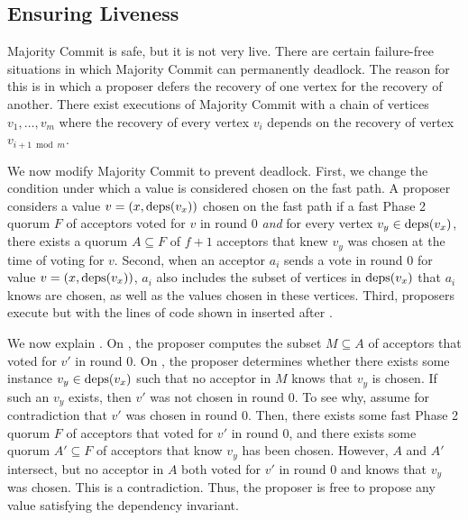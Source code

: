 \subsection{Ensuring Liveness}
Majority Commit \BPaxos{} is safe, but it is not very live. There are certain
failure-free situations in which Majority Commit \BPaxos{} can permanently
deadlock. The reason for this is  in which a proposer
defers the recovery of one vertex for the recovery of another. There exist
executions of Majority Commit \BPaxos{} with a chain of vertices $v_1, \ldots,
v_m$ where the recovery of every vertex $v_i$ depends on the recovery of
vertex $v_{i+1 \bmod m}$.

We now modify Majority Commit \BPaxos{} to prevent deadlock.
%
First, we change the condition under which a value is considered chosen on the
fast path. A proposer considers a value $v = (x, \text{deps}(v_x))$ chosen on the
fast path if a fast Phase 2 quorum $F$ of acceptors voted for $v$ in round $0$
\emph{and} for every vertex $v_y \in \text{deps}(v_x)$, there exists a quorum  $A
\subseteq F$ of $f + 1$ acceptors that knew $v_y$ was chosen at the time of
voting for $v$.
%
Second, when an acceptor $a_i$ sends a  vote in round $0$ for
value $v = (x, \text{deps}(v_x))$, $a_i$ also includes the subset of vertices in
$\text{deps}(v_x)$ that $a_i$ knows are chosen, as well as the values chosen in these
vertices.
%
Third, proposers execute  but with the lines of
code shown in  inserted after
.

{}

We now explain . On , the
proposer computes the subset $M \subseteq A$ of acceptors that voted for $v'$
in round $0$. On , the proposer determines whether
there exists some instance $v_y \in \text{deps}(v_x)$ such that no acceptor in $M$
knows that $v_y$ is chosen. If such an $v_y$ exists, then $v'$ was not chosen
in round $0$. To see why, assume for contradiction that $v'$ was chosen in
round $0$. Then, there exists some fast Phase 2 quorum $F$ of acceptors that
voted for $v'$ in round $0$, and there exists some quorum $A' \subseteq F$ of
acceptors that know $v_y$ has been chosen. However, $A$ and $A'$ intersect, but
no acceptor in $A$ both voted for $v'$ in round $0$ and knows that $v_y$ was
chosen.  This is a contradiction. Thus, the proposer is free to propose any
value satisfying the dependency invariant.

